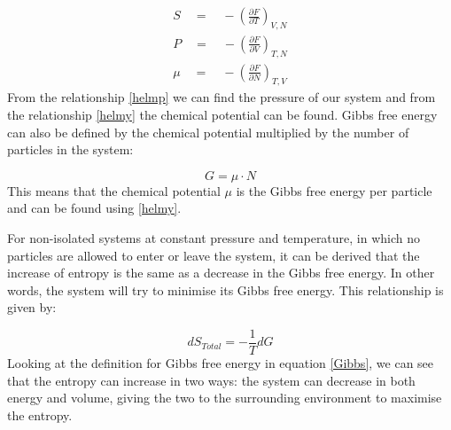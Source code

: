 \documentclass[../hand-in3.tex]{subfiles}
\begin{document}
\begin{align}
S \quad = \quad - \left( \frac{\partial F}{\partial T} \right)_{V,N} \nonumber \\
P \quad = \quad - \left( \frac{\partial F}{\partial V} \right)_{T,N} \label{helmp} \\
\mu \quad = \quad - \left( \frac{\partial F}{\partial N} \right)_{T,V} \label{helmy} 
\end{align}
From the relationship \ref{helmp} we can find the pressure of our system and from the relationship \ref{helmy} the chemical potential can be found. Gibbs free energy can also be defined by the chemical potential multiplied by the number of particles in the system:

\begin{equation}
G = \mu \cdot N
\end{equation} 
This means that the chemical potential $\mu$ is the Gibbs free energy per particle and can be found using \ref{helmy}.

For non-isolated systems at constant pressure and temperature, in which no particles are allowed to enter or leave the system, it can be derived that the increase of entropy is the same as a decrease in the Gibbs free energy. In other words, the system will try to minimise its Gibbs free energy. This relationship is given by:

\begin{equation}
dS_{Total} = - \frac{1}{T} dG
\end{equation}
Looking at the definition for Gibbs free energy in equation \ref{Gibbs}, we can see that the entropy can increase in two ways: the system can decrease in both energy and volume, giving the two to the surrounding environment to maximise the entropy.
\end{document}
